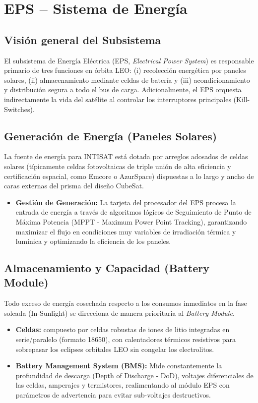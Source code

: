 \chapter{EPS – Sistema de Energía}

\section{Visión general del Subsistema}
El subsistema de Energía Eléctrica (EPS, \textit{Electrical Power System}) es responsable primario de tres funciones en órbita LEO: (i) recolección energética por paneles solares, (ii) almacenamiento mediante celdas de batería y (iii) acondicionamiento y distribución segura a todo el bus de carga. Adicionalmente, el EPS orquesta indirectamente la vida del satélite al controlar los interruptores principales (Kill-Switches).

\section{Generación de Energía (Paneles Solares)}
La fuente de energía para INTISAT está dotada por arreglos adosados de celdas solares (típicamente celdas fotovoltaicas de triple unión de alta eficiencia y certificación espacial, como Emcore o AzurSpace) dispuestas a lo largo y ancho de caras externas del prisma del diseño CubeSat.
\begin{itemize}
    \item \textbf{Gestión de Generación:} La tarjeta del procesador del EPS procesa la entrada de energía a través de algoritmos lógicos de Seguimiento de Punto de Máxima Potencia (MPPT - Maximum Power Point Tracking), garantizando maximizar el flujo en condiciones muy variables de irradiación térmica y lumínica y optimizando la eficiencia de los paneles.
\end{itemize}

\section{Almacenamiento y Capacidad (Battery Module)}
Todo exceso de energía cosechada respecto a los consumos inmediatos en la fase soleada (In-Sunlight) se direcciona de manera prioritaria al \textit{Battery Module}. 
\begin{itemize}
    \item \textbf{Celdas:} compuesto por celdas robustas de iones de litio integradas en serie/paralelo (formato 18650), con calentadores térmicos resistivos para sobrepasar los eclipses orbitales LEO sin congelar los electrolitos.
    \item \textbf{Battery Management System (BMS):} Mide constantemente la profundidad de descarga (Depth of Discharge - DoD), voltajes diferenciales de las celdas, amperajes y termistores, realimentando al módulo EPS con parámetros de advertencia para evitar sub-voltajes destructivos.
\end{itemize}

